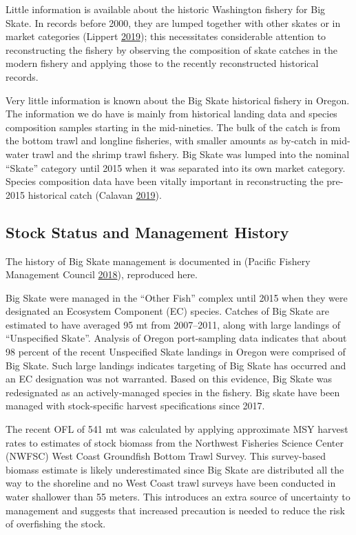 \documentclass[12pt,]{article}
\begin{document}
Little information is available about the historic Washington fishery
for Big Skate. In records before 2000, they are lumped together with
other skates or in market categories (Lippert
\protect\hyperlink{ref-GregLippert}{2019}); this necessitates
considerable attention to reconstructing the fishery by observing the
composition of skate catches in the modern fishery and applying those to
the recently reconstructed historical records.

Very little information is known about the Big Skate historical fishery
in Oregon. The information we do have is mainly from historical landing
data and species composition samples starting in the mid-nineties. The
bulk of the catch is from the bottom trawl and longline fisheries, with
smaller amounts as by-catch in mid-water trawl and the shrimp trawl
fishery. Big Skate was lumped into the nominal ``Skate'' category until
2015 when it was separated into its own market category. Species
composition data have been vitally important in reconstructing the
pre-2015 historical catch (Calavan
\protect\hyperlink{ref-TedCalavan}{2019}).

\hypertarget{stock-status-and-management-history}{%
\subsection{Stock Status and Management
History}\label{stock-status-and-management-history}}

The history of Big Skate management is documented in (Pacific Fishery
Management Council \protect\hyperlink{ref-PFMC2018}{2018}), reproduced
here.

Big Skate were managed in the ``Other Fish'' complex until 2015 when
they were designated an Ecosystem Component (EC) species. Catches of Big
Skate are estimated to have averaged 95 mt from 2007--2011, along with
large landings of ``Unspecified Skate''. Analysis of Oregon
port-sampling data indicates that about 98 percent of the recent
Unspecified Skate landings in Oregon were comprised of Big Skate. Such
large landings indicates targeting of Big Skate has occurred and an EC
designation was not warranted. Based on this evidence, Big Skate was
redesignated as an actively-managed species in the fishery. Big skate
have been managed with stock-specific harvest specifications since 2017.

The recent OFL of 541 mt was calculated by applying approximate MSY
harvest rates to estimates of stock biomass from the Northwest Fisheries
Science Center (NWFSC) West Coast Groundfish Bottom Trawl Survey. This
survey-based biomass estimate is likely underestimated since Big Skate
are distributed all the way to the shoreline and no West Coast trawl
surveys have been conducted in water shallower than 55 meters. This
introduces an extra source of uncertainty to management and suggests
that increased precaution is needed to reduce the risk of overfishing
the stock.
\end{document}
